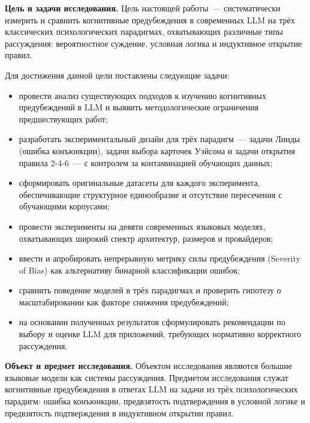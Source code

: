 \textbf{Цель и задачи исследования.}
Цель настоящей работы~--- систематически измерить и сравнить когнитивные предубеждения в современных LLM на трёх классических психологических парадигмах, охватывающих различные типы рассуждения: вероятностное суждение, условная логика и индуктивное открытие правил.

Для достижения данной цели поставлены следующие задачи:
\begin{itemize}
  \item провести анализ существующих подходов к изучению когнитивных предубеждений в LLM и выявить методологические ограничения предшествующих работ;
  \item разработать экспериментальный дизайн для трёх парадигм~--- задачи Линды (ошибка конъюнкции), задачи выбора карточек Уэйсона и задачи открытия правила 2-4-6~--- с контролем за контаминацией обучающих данных;
  \item сформировать оригинальные датасеты для каждого эксперимента, обеспечивающие структурное единообразие и отсутствие пересечения с обучающими корпусами;
  \item провести эксперименты на девяти современных языковых моделях, охватывающих широкий спектр архитектур, размеров и провайдеров;
  \item ввести и апробировать непрерывную метрику силы предубеждения (Severity of Bias) как альтернативу бинарной классификации ошибок;
  \item сравнить поведение моделей в трёх парадигмах и проверить гипотезу о масштабировании как факторе снижения предубеждений;
  \item на основании полученных результатов сформулировать рекомендации по выбору и оценке LLM для приложений, требующих нормативно корректного рассуждения.
\end{itemize}

\textbf{Объект и предмет исследования.}
Объектом исследования являются большие языковые модели как системы рассуждения. Предметом исследования служат когнитивные предубеждения в ответах LLM на задачи из трёх психологических парадигм: ошибка конъюнкции, предвзятость подтверждения в условной логике и предвзятость подтверждения в индуктивном открытии правил.

